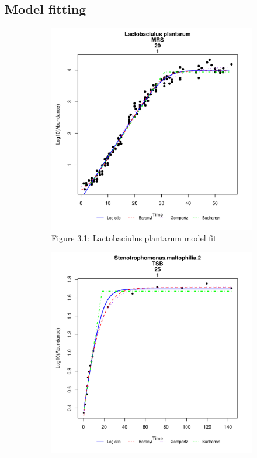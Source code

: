 \documentclass[11pt]{article}
\begin{document}
\subsection{Model fitting}
\begin{figure}[h!]
    \centering
    \begin{subfigure}[h]{0.4\textwidth}
        \includegraphics[width=\textwidth]{../Results/Lplantarum_fit.pdf}
        \caption{Figure 3.1: Lactobaciulus plantarum model fit}
        \label{fig:Lactobaciulus plantarum}
    \end{subfigure}
    \hfill
    \begin{subfigure}[h]{0.4\textwidth}
        \includegraphics[width=\textwidth]{../Results/Smaltophilia25_fit.pdf}

\end{subfigure}
\end{figure}
\end{document}
